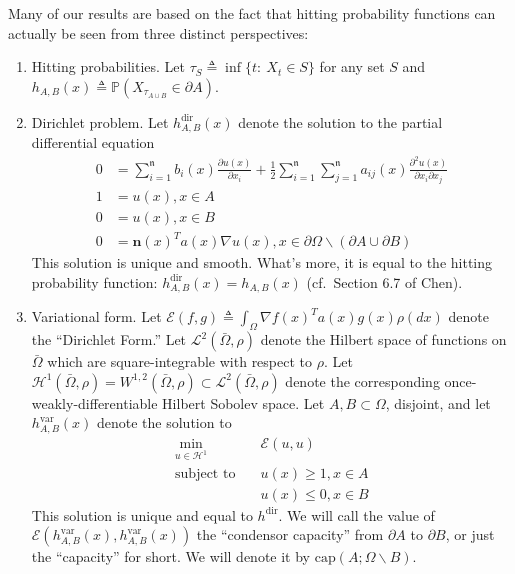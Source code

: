 \documentclass[english, aip, jcp, priprint, graphicx,floatfix]{revtex4-1}
\theoremstyle{plain}
\theoremstyle{definition}
\theoremstyle{plain}
\newcommand{\dimension}{{\mathfrak{n}}}
\newcommand{\capac}[2]{\mathrm{cap}\left(#1;#2\right)}
\begin{document}
Many of our results are based on the fact that hitting probability functions can actually be seen from three distinct perspectives:

\begin{enumerate}
    \item Hitting probabilities.  Let $\tau_S \triangleq \inf\{t:\ X_t \in S\}$ for any set $S$ and $h_{A,B}(x) \triangleq \mathbb{P}(X_{\tau_{A\cup B}}\in \partial A)$.
    
    \item Dirichlet problem.  Let $h^\mathrm{dir}_{A,B}(x)$ denote the solution to the partial differential equation
    \begin{align*}
    0 &= \sum_{i = 1}^\dimension b_i (x) \frac{\partial u
        (x)}{\partial x_i} + \frac{1}{2} \sum_{i = 1}^\dimension \sum_{j = 1}^\dimension a_{ij} (x)
        \frac{\partial^2 u (x)}{\partial x_i \partial x_j}\\
    1 &= u(x),x\in A \\
    0 &= u(x) ,x\in B \\
    0 &= \mathbf{n}(x)^Ta(x)\nabla u(x), x \in \partial{\Omega} \backslash (\partial A \cup \partial B)
    \end{align*}
    This solution is unique and smooth.\cite{lieberman1986mixed}  What's more, it is equal to the hitting probability function: $h^\mathrm{dir}_{A,B}(x)=h_{A,B}(x)$ (cf.\ Section 6.7 of Chen\cite{chen2012symmetric}).

    \item Variational form.  Let $\mathscr{E}(f,g)\triangleq \int_\Omega \nabla f(x)^T a(x) g(x) \rho(dx)$ denote the ``Dirichlet Form.''  Let $\mathscr L^2(\bar \Omega,\rho)$ denote the Hilbert space of functions on $\bar \Omega$ which are square-integrable with respect to $\rho$.  Let $\mathcal{H}^1(\bar \Omega,\rho)=W^{1,2}(\bar \Omega,\rho) \subset \mathscr{L}^2(\bar \Omega,\rho)$ denote the corresponding once-weakly-differentiable Hilbert Sobolev space.  Let $A,B\subset \Omega$, disjoint, and let $h^\mathrm{var}_{A,B}(x)$ denote the solution to 
    \begin{align*}
    \min_{u \in \mathcal H^1} \quad & \mathscr{E}(u,u) \\
    \mbox{subject to} \quad & u(x)\geq1,x\in A \\
     & u(x)\leq0,x\in B
    \end{align*}
    This solution is unique and equal to $h^\mathrm{dir}$.\cite{karatson2005discrete}  We will call the value of $\mathscr{E}(h^\mathrm{var}_{A,B}(x),h^\mathrm{var}_{A,B}(x))$ the ``condensor capacity'' from $\partial A$ to $\partial B$, or just the ``capacity'' for short.  We will denote it by $\capac{A}{\Omega \backslash B}$.
\end{enumerate}
\end{document}
